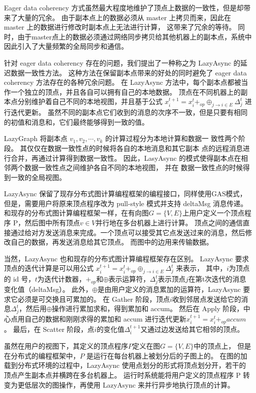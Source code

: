 Eager data coherency 方式虽然最大程度地维护了顶点上数据的一致性，但是却带来了大量的冗余。
由于副本点上的数据必须从 master 上拷贝而来，因此在 master 上的数据进行修改时副本点上无法进行计算，
这带来了冗余的等待。
同时，由于master点上的数据必须通过网络同步拷贝给其他机器上的副本点，系统中因此引入了大量频繁的全局同步和通信。

针对 eager data coherency 存在的问题，我们提出了一种称之为 LazyAsync 的延迟数据一致性方法。
这种方法在保留副本点带来的好处的同时避免了 eager data coherency 方法存在的各种冗余问题。
在 LazyAsync 方法中，每个副本点都被当作一个独立的顶点，并且各自可以拥有自己的本地数据。
顶点在不同机器上的副本点分别维护着自己不同的本地视图，并且基于公式
$x_{i}^{t+1}=x_{i}^{t}+_{o p} \oplus_{j \rightarrow i \in E} \Delta_{j}^{t}$
进行迭代更新。
虽然不同的副本点它们收到的消息的次序不一致，但是只要有相同的初值和消息和，它们最终能够得到一致的值。

LazyGraph 将副本点 $v_1 , v_2 , \cdots , v_k$ 的计算过程分为本地计算和数据一 致性两个阶段。
其仅仅在数据一致性点的时候将各自的本地消息和其它副本 点的远程消息进行合并，再通过计算得到数据一致性。
因此，LasyAsync 的模式使得副本点在相邻两个数据一致性点之间维护各自不同的本地视图，
并在 数据一致性点的时候得到一致的全局视图。


LazyAsync 保留了现存分布式图计算编程框架的编程接口，同样使用GAS模式，
但是，需要用户将原来顶点程序改为 pull-style 模式并支持 deltaMsg 消息传递。
和现存的分布式图计算编程框架一样，在有向图$G = \{V, E\}$上用户定义一个顶点程序 P，然后图中所有顶点$v \in V$并行地在多台机器上进行计算。
顶点之间的通信直接通过给对方发送消息来完成。一个顶点可以接受其它点发送过来的消息，然后修改自己的数据，再发送消息给其它顶点。
而图中的边用来传输数据。


当然，LazyAsync 也和现存的分布式图计算编程框架存在区别。
LazyAsync 要求顶点的迭代计算是可以用公式 $x_i^{t+1} = x_i^t +_{op} \oplus_{j \rightarrow i \in E} \Delta_j^t$ 来表示，
其中，$i$为顶点的 id 号，$t$为迭代计数器，$+_{op}$和$\oplus$表示运算符，$\Delta_j^t$表示顶点$j$在第t次迭代的消息变化值（deltaMsg）。
此外，$\oplus$是由用户定义的消息累加的运算符，LazyAsync 要求它必须是可交换且可累加的。
在 Gather 阶段，顶点$i$收到邻居点发送给它的消息$\Delta_j^t$，然后用$\oplus$操作进行累加求和，得到累加和 accum。
然后在 Apply 阶段，中心点用自己的数据和刚刚求得的累加和 accum 进行迭代更新$x_i^{t+1} = x_i^t +_{op} accum$。
最后，在 Scatter 阶段，点$i$的变化值$\Delta_i^{t+1}$又通过边发送给其它相邻的顶点。


虽然在用户的视图下，其定义的顶点程序$P$定义在图$G = \{V,E\}$中的顶点上，
但是在分布式的编程框架中，$P$ 是运行在每台机器上被划分后的子图上的。
在图的加载到分布式环境的过程中，LazyAsync 使用点划分的形式将顶点划分开，若干的顶点产生副本点并横跨在多台机器上。
运行时系统能将用户定义的顶点程序 P 转变为更低层次的图操作，再使用 LazyAsync 来并行异步地执行顶点的计算。

